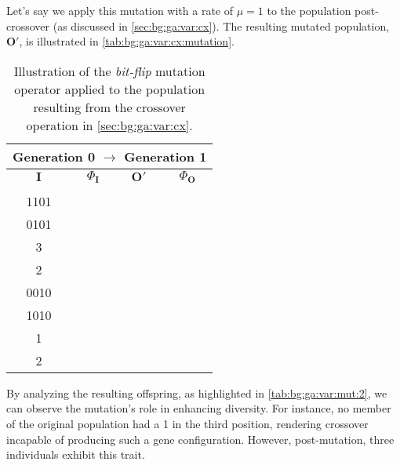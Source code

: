   Let's say we apply this mutation with a rate of \(\mu = 1\) to the population 
  post-crossover (as discussed in \vref{sec:bg:ga:var:cx}).
  The resulting mutated population, \(\mathbf{O}'\), is illustrated in 
  \vref{tab:bg:ga:var:cx:mutation}.

  
  \begin{table}[ht!]
    \centering
    \begin{tabular}{|c|c|c|c|}
      \multicolumn{4}{c}{\textbf{Generation 0} \(\to\) \textbf{Generation 1}} \\
      \hline
      \hline
      \(\mathbf{I}\) & \(\Phi_\mathbf{I}\) & \(\mathbf{O}'\) & \(\Phi_\mathbf{O}\) \\
      \hline
      \Gape[2pt][2pt]{\(\begin{bmatrix} 0000 \\ 1101 \\ 0101 \end{bmatrix}\)}
        & \(\begin{bmatrix} 0 \\ 3 \\ 2 \end{bmatrix}\)
        & \(\begin{bmatrix} 1111 \\ 0010 \\ 1010 \end{bmatrix}\) 
        & \(\begin{bmatrix} 4 \\ 1 \\ 2 \end{bmatrix}\) \\[1em]
      \hline
    \end{tabular}
    \caption{
      Illustration of the \emph{bit-flip} mutation operator applied to the 
      population resulting from the crossover operation in 
      \vref{sec:bg:ga:var:cx}.
    }
    \label{tab:bg:ga:var:cx:mutation}
  \end{table}

  By analyzing the resulting offspring, as highlighted in 
  \vref{tab:bg:ga:var:mut:2}, we can observe the mutation's role in enhancing 
  diversity.
  For instance, no member of the original population had a 1 in the third 
  position, rendering crossover incapable of producing such a gene 
  configuration.
  However, post-mutation, three individuals exhibit this trait.

